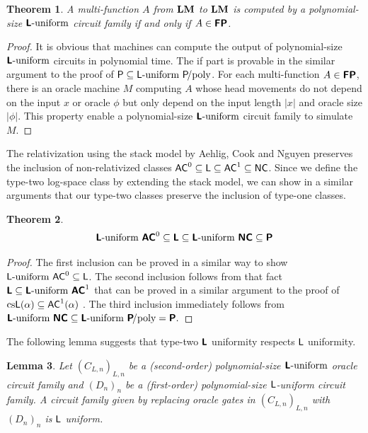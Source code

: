 \documentclass{article}
\newtheorem{theorem}{Theorem}[section]
\newtheorem{lemma}[theorem]{Lemma}
\theoremstyle{definition}
\theoremstyle{remark}
\begin{document}
\begin{theorem}
\label{theorem:P-equals-L-uniform-P-poly}
A multi-function $A$ from $\mathbf{LM}$ to $\mathbf{LM}$ is computed by a polynomial-size
$\text{\bfseries \sffamily \upshape L}\text{-uniform}$ circuit family if and only if $A \in \text{\bfseries \sffamily \upshape FP}$.
\end{theorem}

\begin{proof}
 It is obvious that machines can compute the output of
 polynomial-size $\text{\bfseries \sffamily \upshape L}\text{-uniform}$ circuits in polynomial time.
 The if part is provable in the similar argument to the proof of
 $\classP \subseteq \classL\uniform\ \classP\!\text{/poly}$.
 For each multi-function $A \in \text{\bfseries \sffamily \upshape FP}$, there is an oracle machine $M$
 computing $A$ whose head movements do not depend on the input $x$ or oracle
 $\phi$ but only depend on the input length $|x|$ and oracle size $|\phi|$.
 This property enable a polynomial-size $\text{\bfseries \sffamily \upshape L}\text{-uniform}$ circuit family to simulate $M$.
\end{proof}

The relativization using the stack model by Aehlig, Cook and Nguyen preserves
the inclusion of non-relativized classes
$\mathsf{AC}^0 \subseteq \mathsf{L} \subseteq \mathsf{AC}^1 \subseteq \mathsf{NC}$.
Since we define the type-two log-space class by extending the stack model,
we can show in a similar arguments 
that our type-two classes preserve the inclusion of type-one classes.

\begin{theorem}
\label{theorem:inclusion}
\begin{equation}
 \text{\bfseries \sffamily \upshape L}\text{-uniform}\ \text{\bfseries \sffamily \upshape AC}^0
 \subseteq \text{\bfseries \sffamily \upshape L} 
 \subseteq \text{\bfseries \sffamily \upshape L}\text{-uniform}\ \text{\bfseries \sffamily \upshape NC}
 \subseteq \text{\bfseries \sffamily \upshape P}
\end{equation}
\end{theorem}

\begin{proof}
 The first inclusion can be proved in a similar way
 to show $\mathsf{L}\text{-uniform}\ \mathsf{AC}^0 \subseteq \mathsf{L}$.
 The second inclusion follows from that fact 
 $\classLtwo \subseteq \Luniform\ \classACtwo^1$ 
 that can be proved in a similar argument to 
 the proof of $\text{cs}\mathsf{L}(\alpha) \subseteq \mathsf{AC}^1(\alpha)$
 \cite{aehlig2007relativizing}.
 The third inclusion immediately follows from
$
 \Luniform\ \classNCtwo \subseteq \Luniform\ \classPtwo\text{\!/poly} = \classPtwo.
$
\end{proof}


The following lemma suggests that type-two $\text{\bfseries \sffamily \upshape L}$ uniformity respects
$\mathsf{L}$ uniformity.
\begin{lemma}
 Let $(C_{L,n})_{L,n}$ be a (second-order) polynomial-size $\text{\bfseries \sffamily \upshape L}\text{-uniform}$ oracle circuit family
 and $(D_n)_n$ be a (first-order) polynomial-size $\mathsf{L}$-uniform circuit family.
 A circuit family given by replacing oracle gates in $(C_{L,n})_{L,n}$ with
 $(D_n)_n$ is $\mathsf{L}$ uniform.
\end{lemma}
\end{document}
